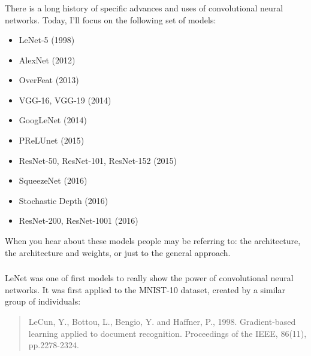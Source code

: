\documentclass[xetex,mathserif,serif,aspectratio=169]{beamer}
\begin{document}
\begin{frame}[fragile] \frametitle{} \oldB \footnotesize


There is a long history of specific advances and uses of convolutional
neural networks. Today, I'll focus on the following set of models: \vspace*{-0.5cm}
\begin{itemize}
\item LeNet-5 (1998)
\item AlexNet (2012)
\item OverFeat (2013)
\item VGG-16, VGG-19 (2014)
\item GoogLeNet (2014)
\item PReLUnet (2015)
\item ResNet-50, ResNet-101, ResNet-152 (2015)
\item SqueezeNet (2016)
\item Stochastic Depth (2016)
\item ResNet-200, ResNet-1001 (2016)
\end{itemize} \vspace*{-0.5cm}
When you hear about these models people may be referring to: the architecture,
the architecture and weights, or just to the general approach.

\end{frame}

\begin{frame}[fragile] \frametitle{} \oldB \small


LeNet was one of first models to really show the power of convolutional
neural networks. It was first applied to the MNIST-10 dataset, created
by a similar group of individuals:
\begin{quote}
LeCun, Y., Bottou, L., Bengio, Y. and Haffner, P., 1998. Gradient-based
learning applied to document recognition. Proceedings of the IEEE, 86(11),
pp.2278-2324.
\end{quote}

\end{frame}
\end{document}
